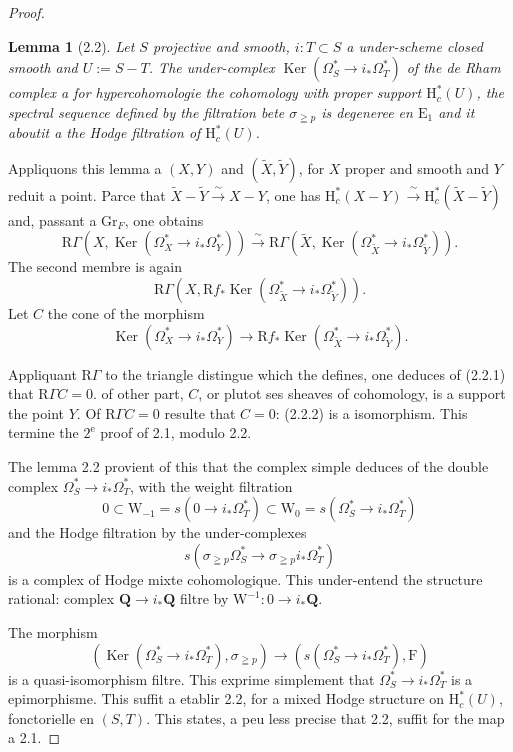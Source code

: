 \documentclass[12pt,a4paper]{article}
\theoremstyle{plain}
\newtheorem{lemma}[theorem]{Lemma}
\theoremstyle{definition}
\DeclareMathOperator{\Ker}{Ker}
\begin{document}
\begin{proof}[Proof]
\begin{lemma}[2.2]
Let $S$ projective and smooth, $i : T \subset S$ a under-scheme closed smooth and $U := S - T$. The under-complex $\Ker(\Omega_S^* \to i_* \Omega_T^*)$ of the de Rham complex a for hypercohomologie the cohomology with proper support $\mathrm{H}_c^*(U)$, the spectral sequence defined by the filtration bete $\sigma_{\geqq p}$ is degeneree en $\mathrm{E}_1$ and it aboutit a the Hodge filtration of $\mathrm{H}_c^*(U)$.
\end{lemma}

Appliquons this lemma a $(X, Y)$ and $(\tilde{X}, \tilde{Y})$, for $X$ proper and smooth and $Y$ reduit a point. Parce that $\tilde{X} - \tilde{Y} \xrightarrow{\;\sim\;} X - Y$, one has $\mathrm{H}_c^*(X-Y) \xrightarrow{\;\sim\;} \mathrm{H}_c^*(\tilde{X} - \tilde{Y})$ and, passant a $\mathrm{Gr}_F$, one obtains
\begin{equation}\label{eq:2.2.1}
\mathrm{R}\Gamma(X, \Ker(\Omega_X^* \to i_* \Omega_Y^*)) \xrightarrow{\;\sim\;} \mathrm{R}\Gamma(\tilde{X}, \Ker(\Omega_{\tilde{X}}^* \to i_* \Omega_{\tilde{Y}}^*)).
\tag{2.2.1}
\end{equation}
The second membre is again
\[
\mathrm{R}\Gamma(X, \mathrm{R}f_* \Ker(\Omega_{\tilde{X}}^* \to i_* \Omega_{\tilde{Y}}^*)).
\]
Let $C$ the cone of the morphism
\begin{equation}\label{eq:2.2.2}
\Ker(\Omega_X^* \to i_* \Omega_Y^*) \to \mathrm{R}f_* \Ker(\Omega_{\tilde{X}}^* \to i_* \Omega_{\tilde{Y}}^*).
\tag{2.2.2}
\end{equation}

Appliquant $\mathrm{R}\Gamma$ to the triangle distingue which the defines, one deduces of (2.2.1) that $\mathrm{R}\Gamma C = 0$. of other part, $C$, or plutot ses sheaves of cohomology, is a support the point $Y$. Of $\mathrm{R}\Gamma C = 0$ resulte that $C = 0$: (2.2.2) is a isomorphism. This termine the $2^{\text{e}}$ proof of 2.1, modulo 2.2.

The lemma 2.2 provient of this that the complex simple deduces of the double complex $\Omega_S^* \to i_* \Omega_T^*$, with the weight filtration
\[
0 \subset \mathrm{W}_{-1} = s(0 \to i_* \Omega_T^*) \subset \mathrm{W}_0 = s(\Omega_S^* \to i_* \Omega_T^*)
\]
and the Hodge filtration by the under-complexes
\[
s(\sigma_{\geqq p} \Omega_S^* \to \sigma_{\geqq p} i_* \Omega_T^*)
\]
is a complex of Hodge mixte cohomologique. This under-entend the structure rational: complex $\mathbf{Q} \to i_* \mathbf{Q}$ filtre by $\mathrm{W}^{-1} : 0 \to i_* \mathbf{Q}$.

The morphism
\[
(\Ker(\Omega_S^* \to i_* \Omega_T^*), \sigma_{\geqq p}) \to (s(\Omega_S^* \to i_* \Omega_T^*), \mathrm{F})
\]
is a quasi-isomorphism filtre. This exprime simplement that $\Omega_S^* \to i_* \Omega_T^*$ is a epimorphisme. This suffit a etablir 2.2, for a mixed Hodge structure on $\mathrm{H}_c^*(U)$, fonctorielle en $(S, T)$. This states, a peu less precise that 2.2, suffit for the map a 2.1.
\end{proof}
\end{document}
